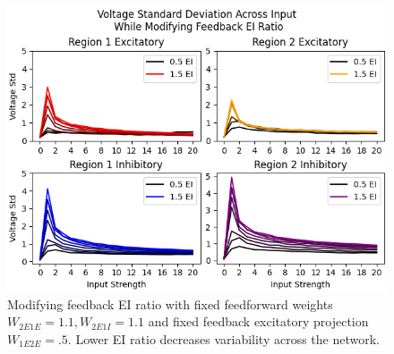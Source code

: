\documentclass[10pt]{article}
\begin{document}
\begin{figure}
    \centering
    \includegraphics[scale=.8]{twoRegion/EIRatioVoltageStd.png}
    \caption{Modifying feedback EI ratio with fixed feedforward weights $W_{2E1E} = 1.1, W_{2E1I}=1.1$ and fixed feedback excitatory projection $W_{1E2E} = .5$. Lower EI ratio decreases variability across the network.}
\end{figure}
\end{document}
